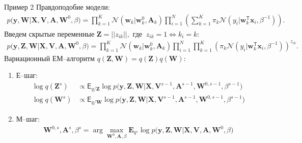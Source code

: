 \documentclass[9pt,pdf,hyperref={unicode}]{beamer}
\begin{document}
\begin{frame}{Пример 2}
\justifying
Правдоподобие модели:
	\begin{equation}
	\label{sl:6:eq:1}
		\begin{aligned}
			p\bigr(\mathbf{y}, \mathbf{W}|\mathbf{X}, \mathbf{V}, \textbf{A}, \textbf{W}^{0}, \beta\bigr) = \prod_{k=1}^{K}\mathcal{N}\left(\mathbf{w}_{k}|\mathbf{w}^{0}_{k}, \mathbf{A}_{k}\right)\prod_{i=1}^{N}\left(\sum_{k=1}^{K}\pi_{k}\mathcal{N}\left(y_{i}|\mathbf{w}_{k}^{\mathsf{T}}\mathbf{x}_{i}, \beta^{-1}\right)\right).
		\end{aligned}
	\end{equation}
Введем скрытые переменные $\textbf{Z} = ||z_{ik}||,$ где $~z_{ik} = 1 \Leftrightarrow k_i=k$:
	\begin{equation}
	\label{sl:6:eq:2}
		\begin{aligned}
			p\bigr(\mathbf{y}, \textbf{Z}, \mathbf{W}|\mathbf{X}, \mathbf{V}, \textbf{A}, \textbf{W}^{0}, \beta\bigr) = \prod_{k=1}^{K}\mathcal{N}\left(\mathbf{w}_{k}|\mathbf{w}^{0}_{k}, \mathbf{A}_{k}\right)\prod_{i=1}^{N}\prod_{k=1}^{K}\left(\pi_{k}\mathcal{N}\left(y_{i}|\mathbf{w}_{k}^{\mathsf{T}}\mathbf{x}_{i}, \beta^{-1}\right)\right)^{z_{ik}}.		
		\end{aligned}
	\end{equation}
Вариационный ЕМ--алгоритм $q\left(\textbf{Z}, \textbf{W}\right) = q\left(\textbf{Z}\right)q\left(\textbf{W}\right)$:
	\begin{enumerate}
		\item Е--шаг: 
			\begin{equation}
			\label{sl:3:eq:3}
				\begin{aligned}
					\log q\left(\textbf{Z}^{s}\right) &\propto \mathsf{E}_{q/\textbf{Z}}\log p\bigr(\mathbf{y}, \textbf{Z},\mathbf{W}|\mathbf{X}, \mathbf{V}^{s-1}, \textbf{A}^{s-1}, \textbf{W}^{0, s-1}, \beta^{s-1}\bigr)\\
					\log q\left(\textbf{W}^{s}\right) &\propto \mathsf{E}_{q/\textbf{W}}\log p\bigr(\mathbf{y}, \textbf{Z},\mathbf{W}|\mathbf{X}, \mathbf{V}^{s-1}, \textbf{A}^{s-1}, \textbf{W}^{0, s-1}, \beta^{s-1}\bigr)
				\end{aligned}
			\end{equation}
		\item М--шаг: 
			\begin{equation}
			\label{sl:3:eq:4}
				\begin{aligned}
					\textbf{W}^{0, s}, \textbf{A}^{s}, \beta^{s} = \arg\max_{\textbf{W}^{0}, \textbf{A}, \beta} \mathbf{E}_{q^{s}}\log p\bigr(\mathbf{y}, \textbf{Z},\mathbf{W}|\mathbf{X}, \mathbf{V}, \textbf{A}, \textbf{W}^{0}, \beta\bigr)
				\end{aligned}
			\end{equation}
	\end{enumerate}
\end{frame}
\end{document}
